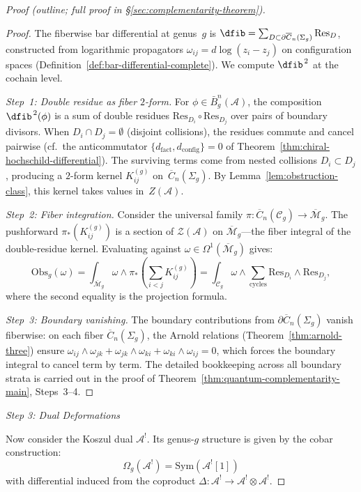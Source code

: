 \begin{proof}[Proof (outline; full proof in \S\textup{\ref{sec:complementarity-theorem}})]
\begin{proof}
The fiberwise bar differential at genus~$g$ is
$\dfib = \sum_{D \subset \partial \overline{C}_n(\Sigma_g)} \mathrm{Res}_D$,
constructed from logarithmic propagators
$\omega_{ij} = d\log(z_i - z_j)$ on configuration spaces
(Definition~\ref{def:bar-differential-complete}).  We compute $\dfib^{\,2}$ at the
cochain level.

\emph{Step~1: Double residue as fiber $2$-form.}
For $\phi \in \bar{B}^n_g(\mathcal{A})$, the composition $\dfib^{\,2}(\phi)$
is a sum of double residues $\mathrm{Res}_{D_i} \circ \mathrm{Res}_{D_j}$
over pairs of boundary divisors.  When $D_i \cap D_j = \emptyset$
(disjoint collisions), the residues commute and cancel pairwise
(cf.\ the anticommutator $\{d_{\mathrm{fact}}, d_{\mathrm{config}}\} = 0$
of Theorem~\ref{thm:chiral-hochschild-differential}).
The surviving terms come from nested collisions $D_i \subset D_j$,
producing a $2$-form kernel $K_{ij}^{(g)}$ on~$\overline{C}_n(\Sigma_g)$.
By Lemma~\ref{lem:obstruction-class}, this kernel takes values
in~$Z(\mathcal{A})$.

\emph{Step~2: Fiber integration.}
Consider the universal family
$\pi\colon \overline{C}_n(\mathcal{C}_g) \to \overline{\mathcal{M}}_g$.
The pushforward $\pi_*(K_{ij}^{(g)})$ is a section of
$\mathcal{Z}(\mathcal{A})$ on $\overline{\mathcal{M}}_g$---the
fiber integral of the double-residue kernel.  Evaluating against
$\omega \in \Omega^1(\overline{\mathcal{M}}_g)$ gives:
\[
\mathrm{Obs}_g(\omega)
= \int_{\overline{\mathcal{M}}_g} \omega \wedge \pi_*\!\left(
\sum_{i < j} K_{ij}^{(g)}\right)
= \int_{\mathcal{C}_g} \omega \wedge
\sum_{\text{cycles}} \mathrm{Res}_{D_i} \wedge \mathrm{Res}_{D_j},
\]
where the second equality is the projection formula.

\emph{Step~3: Boundary vanishing.}
The boundary contributions from $\partial\overline{C}_n(\Sigma_g)$
vanish fiberwise: on each fiber $\overline{C}_n(\Sigma_g)$, the
Arnold relations (Theorem~\ref{thm:arnold-three}) ensure
$\omega_{ij} \wedge \omega_{jk} + \omega_{jk} \wedge \omega_{ki}
+ \omega_{ki} \wedge \omega_{ij} = 0$, which forces the boundary
integral to cancel term by term.
The detailed bookkeeping across all boundary strata is carried out in
the proof of Theorem~\ref{thm:quantum-complementarity-main},
Steps~3--4.
\end{proof}

\emph{Step 3: Dual Deformations}

Now consider the Koszul dual $\mathcal{A}^!$. Its genus-$g$ structure is given by 
the cobar construction:
\[\Omega_g(\mathcal{A}^!) = \text{Sym}(\mathcal{A}^![1])\]
with differential induced from the coproduct $\Delta: \mathcal{A}^! \to 
\mathcal{A}^! \otimes \mathcal{A}^!$.


\end{proof}
